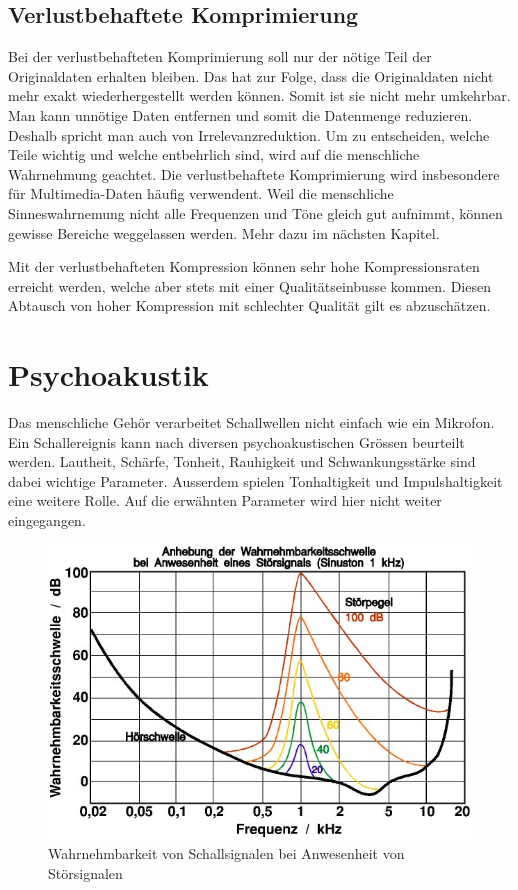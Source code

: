 \begin{refsection}
\subsection{Verlustbehaftete Komprimierung}
Bei der verlustbehafteten Komprimierung soll nur der nötige Teil der Originaldaten erhalten bleiben.
Das hat zur Folge, dass die Originaldaten nicht mehr exakt wiederhergestellt werden können. 
Somit ist sie nicht mehr umkehrbar.
Man kann unnötige Daten entfernen und somit die Datenmenge reduzieren.
Deshalb spricht man auch von Irrelevanzreduktion.
Um zu entscheiden, welche Teile wichtig und welche entbehrlich sind, wird auf die menschliche Wahrnehmung geachtet.
Die verlustbehaftete Komprimierung wird insbesondere für Multimedia-Daten häufig verwendent.
Weil die menschliche Sinneswahrnemung nicht alle Frequenzen und Töne gleich gut aufnimmt, können gewisse Bereiche weggelassen werden.
Mehr dazu im nächsten Kapitel.

Mit der verlustbehafteten Kompression können sehr hohe Kompressionsraten erreicht werden, welche aber stets mit einer Qualitätseinbusse kommen.
Diesen Abtausch von hoher Kompression mit schlechter Qualität gilt es abzuschätzen.

\section{Psychoakustik}
Das menschliche Gehör verarbeitet Schallwellen nicht einfach wie ein Mikrofon.
Ein Schallereignis kann nach diversen psychoakustischen Grössen beurteilt werden.
Lautheit, Schärfe, Tonheit, Rauhigkeit und Schwankungsstärke sind dabei wichtige Parameter.
Ausserdem spielen Tonhaltigkeit und Impulshaltigkeit eine weitere Rolle.
Auf die erwähnten Parameter wird hier nicht weiter eingegangen.

\begin{figure}[h]
	\centering
	\includegraphics[width=0.6\linewidth]{papers/compress/Bilder/Akustik_Mithoerschwelle2}
	\caption{Wahrnehmbarkeit von Schallsignalen bei Anwesenheit von Störsignalen \cite{skript:Akustik 2}}
	\label{fig: Wahrnehmbarkeitsschwelle}
\end{figure}


\end{refsection}
